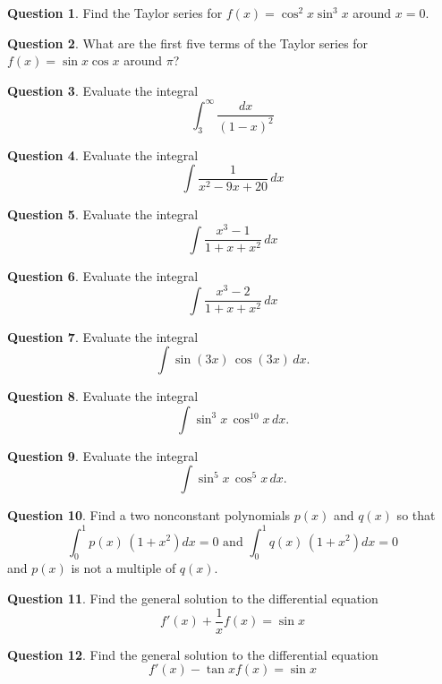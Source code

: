 \documentclass[12pt]{article}
\theoremstyle{definition}
\newtheorem{question}{Question}
\begin{document}
\begin{question}
Find the Taylor series for $f(x) = \cos^2 x \sin^3 x$ around $x = 0$.
\end{question}

\begin{question}
What are the first five terms of the Taylor series for
$f(x) = \sin x \cos x$ around $\pi$?
\end{question}

\begin{question}
Evaluate the integral
$$
\int_3^\infty \frac{dx}{(1-x)^2}
$$
\end{question}

\begin{question}
Evaluate the integral
$$
\int \frac{1}{x^2 - 9x + 20} \, dx
$$
\end{question}

\begin{question}
Evaluate the integral
$$
\int \frac{x^3 - 1}{1 + x + x^2} \, dx
$$
\end{question}

\begin{question}
Evaluate the integral
$$
\int \frac{x^3 - 2}{1 + x + x^2} \, dx
$$
\end{question}

\begin{question}
Evaluate the integral
$$
\int \sin (3x) \, \cos (3x) \, dx.
$$
\end{question}

\begin{question}
Evaluate the integral
$$
\int \sin^3 x \, \cos^{10} x \, dx.
$$
\end{question}

\begin{question}
Evaluate the integral
$$
\int \sin^5 x \, \cos^5 x \, dx.
$$
\end{question}

\begin{question}
Find a two nonconstant polynomials $p(x)$ and $q(x)$ so that
$$
\int_0^1 p(x) \, (1 + x^2) dx = 0 \mbox{ and } \int_0^1 q(x) \, (1 + x^2) dx = 0
$$
and $p(x)$ is not a multiple of $q(x)$.
\end{question}

\begin{question}
Find the general solution to the differential equation
$$
f'(x) + \frac{1}{x} f(x) = \sin x
$$
\end{question}

\begin{question}
Find the general solution to the differential equation
$$
f'(x) - \tan x f(x) = \sin x
$$
\end{question}
\end{document}
